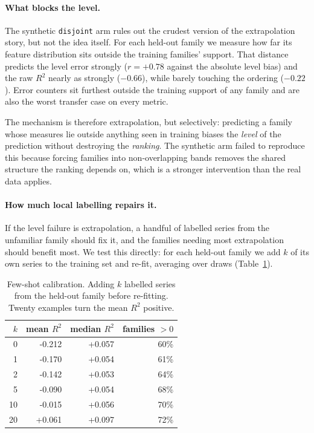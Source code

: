 \documentclass[11pt,a4paper]{article}
\newcommand{\num}[1]{#1}
\begin{document}
\paragraph{What blocks the level.} The synthetic \texttt{disjoint} arm rules
out the crudest version of the extrapolation story, but not the idea itself. For
each held-out family we measure how far its feature distribution sits outside
the training families' support. That distance predicts the level error strongly
(\(r=+0.78\) against the absolute level bias) and the raw \(R^2\) nearly as
strongly (\(-0.66\)), while barely touching the ordering (\(-0.22\)). Error
counters sit furthest outside the training support of any family and are also
the worst transfer case on every metric.

The mechanism is therefore extrapolation, but selectively: predicting a family
whose measures lie outside anything seen in training biases the \emph{level} of
the prediction without destroying the \emph{ranking}. The synthetic arm failed
to reproduce this because forcing families into non-overlapping bands removes
the shared structure the ranking depends on, which is a stronger intervention
than the real data applies.

\paragraph{How much local labelling repairs it.} If the level failure is
extrapolation, a handful of labelled series from the unfamiliar family should
fix it, and the families needing most extrapolation should benefit most. We test
this directly: for each held-out family we add \(k\) of its own series to the
training set and re-fit, averaging over draws
(Table~\ref{tab:fewshot}).

\begin{table}[t]
\centering
\caption{Few-shot calibration. Adding \(k\) labelled series from the held-out
family before re-fitting. Twenty examples turn the mean \(R^2\) positive.}
\label{tab:fewshot}
\small
\begin{tabular}{rrrr}
\toprule
\(k\) & mean \(R^2\) & median \(R^2\) & families \(>0\) \\
\midrule
0  & \num{-0.212} & \num{+0.057} & 60\% \\
1  & \num{-0.170} & \num{+0.054} & 61\% \\
2  & \num{-0.142} & \num{+0.053} & 64\% \\
5  & \num{-0.090} & \num{+0.054} & 68\% \\
10 & \num{-0.015} & \num{+0.056} & 70\% \\
20 & \num{+0.061} & \num{+0.097} & 72\% \\
\bottomrule
\end{tabular}
\end{table}
\end{document}
